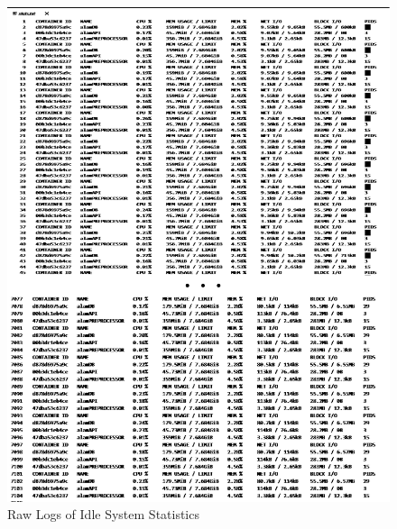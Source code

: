 \begin{figure}[ht]
    \centering
    \includegraphics[height=0.80\textheight]{./assets/Appendices/B/RawTestsData/RawLogs/IdleStats.png}
    \caption{Raw Logs of Idle System Statistics}
    \label{fig:idleStats}
\end{figure}
\FloatBarrier

